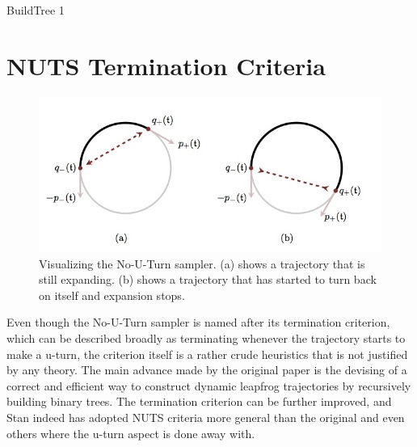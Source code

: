 \documentclass[12pt]{report}
\begin{document}
\begin{algorithm}

\caption{BuildTree 1}
\end{algorithm}


\section{NUTS Termination Criteria}

\begin{figure}[h!]
\includegraphics[scale=0.5]{cropped_nuts_image}
  \caption{Visualizing the No-U-Turn sampler. (a) shows a trajectory that is still expanding. (b) shows a trajectory that has started to turn back on itself and expansion stops. }
  \label{nuts-figures}
\end{figure}

Even though the No-U-Turn sampler is named after its termination criterion, which can be described broadly as terminating whenever the trajectory starts to make a u-turn, the criterion itself is a rather crude heuristics that is not justified by any theory. The main advance made by the original paper \cite{hoffman2014no} is the devising of a correct and efficient way to construct dynamic leapfrog trajectories by recursively building binary trees. The termination criterion can be further improved, and Stan indeed has adopted NUTS criteria more general than the original and even others where the u-turn aspect is done away with. 
\end{document}
